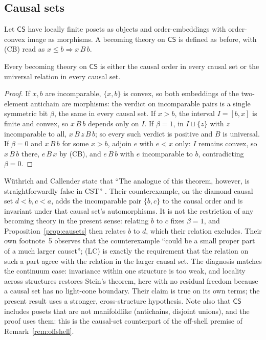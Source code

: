 \subsection{Causal sets}\label{sec:causets}

Let $\mathsf{CS}$ have locally finite posets as objects and order-embeddings
with order-convex image as morphisms. A becoming theory on $\mathsf{CS}$ is
defined as before, with (CB) read as $x\le b\Rightarrow x\,B\,b$.

\begin{proposition}\label{prop:causets}
Every becoming theory on $\mathsf{CS}$ is either the causal order in every
causal set or the universal relation in every causal set.
\end{proposition}

\begin{proof}
If $x,b$ are incomparable, $\{x,b\}$ is convex, so both embeddings of the
two-element antichain are morphisms: the verdict on incomparable pairs is a
single symmetric bit $\beta$, the same in every causal set. If $x>b$, the
interval $I=[b,x]$ is finite and convex, so $x\,B\,b$ depends only on $I$. If
$\beta=1$, in $I\sqcup\{z\}$ with $z$ incomparable to all, $x\,B\,z\,B\,b$; so
every such verdict is positive and $B$ is universal. If $\beta=0$ and
$x\,B\,b$ for some $x>b$, adjoin $e$ with $e<x$ only: $I$ remains convex, so
$x\,B\,b$ there, $e\,B\,x$ by (CB), and $e\,B\,b$ with $e$ incomparable to $b$,
contradicting $\beta=0$.
\end{proof}

Wüthrich and Callender state that ``The analogue of this theorem, however, is
straightforwardly false in CST'' \citep[\S3]{WC2017}. Their counterexample, on
the diamond causal set $d<b,c<a$, adds the incomparable pair $\{b,c\}$ to the
causal order and is invariant under that causal set's automorphisms. It is not
the restriction of any becoming theory in the present sense: relating $b$ to
$c$ fixes $\beta=1$, and Proposition~\ref{prop:causets} then relates $b$ to $d$,
which their relation excludes. Their own footnote~5 observes that the
counterexample ``could be a small proper part of a much larger causet''; (LC) is
exactly the requirement that the relation on such a part agree with the
relation in the larger causal set. The diagnosis matches the continuum case:
invariance within one structure is too weak, and locality across structures
restores Stein's theorem, here with no residual freedom because a causal set
has no light-cone boundary. Their claim is true on its own terms; the present
result uses a stronger, cross-structure hypothesis. Note also that
$\mathsf{CS}$ includes posets that are not manifoldlike (antichains, disjoint
unions), and the proof uses them: this is the causal-set counterpart of the
off-shell premise of Remark~\ref{rem:offshell}.

